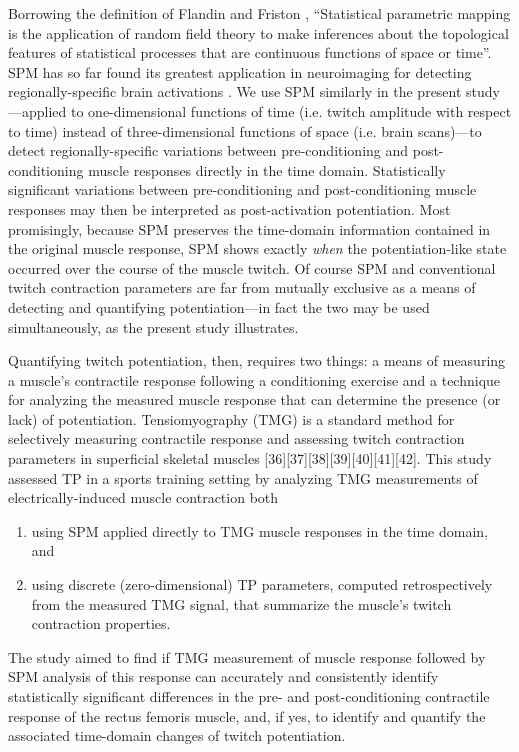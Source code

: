 \documentclass[utf8]{style/FrontiersinHarvard}
\begin{document}
Borrowing the definition of Flandin and Friston \cite{flandin}, 
``Statistical parametric mapping is the application of random field theory to make inferences about the topological features of statistical processes that are continuous functions of space or time''.
SPM has so far found its greatest application in neuroimaging for detecting regionally-specific brain activations \cite{friston}.
We use SPM similarly in the present study---applied to one-dimensional functions of time (i.e. twitch amplitude with respect to time) instead of three-dimensional functions of space (i.e. brain scans)---to detect regionally-specific variations between pre-conditioning and post-conditioning muscle responses directly in the time domain.
Statistically significant variations between pre-conditioning and post-conditioning muscle responses may then be interpreted as post-activation potentiation.
Most promisingly, because SPM preserves the time-domain information contained in the original muscle response, SPM shows exactly \textit{when} the potentiation-like state occurred over the course of the muscle twitch.
Of course SPM and conventional twitch contraction parameters are far from mutually exclusive as a means of detecting and quantifying potentiation---in fact the two may be used simultaneously, as the present study illustrates.

Quantifying twitch potentiation, then, requires two things: a means of measuring a muscle's contractile response following a conditioning exercise and a technique for analyzing the measured muscle response that can determine the presence (or lack) of potentiation.
Tensiomyography (TMG) is a standard method for selectively measuring contractile response and assessing twitch contraction parameters in superficial skeletal muscles [36][37][38][39][40][41][42].
This study assessed TP in a sports training setting by analyzing TMG measurements of electrically-induced muscle contraction both
\begin{enumerate}

    \item using SPM applied directly to TMG muscle responses in the time domain, and

    \item using discrete (zero-dimensional) TP parameters, computed retrospectively from the measured TMG signal, that summarize the muscle's twitch contraction properties.

\end{enumerate}
The study aimed to find if TMG measurement of muscle response followed by SPM analysis of this response can accurately and consistently identify statistically significant differences in the pre- and post-conditioning contractile response of the rectus femoris muscle, and,
if yes, to identify and quantify the associated time-domain changes of twitch potentiation.
\end{document}
